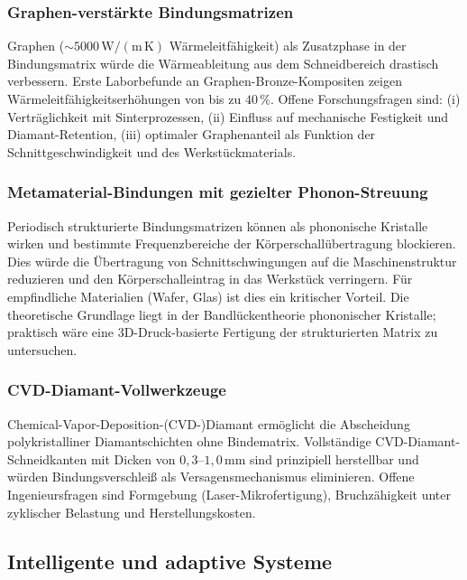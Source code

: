 ﻿\documentclass[a4paper,12pt]{article}
\theoremstyle{definition}
\begin{document}
\subsubsection{Graphen-verstärkte Bindungsmatrizen}

Graphen ($\sim 5000\,\mathrm{W/(m\,K)}$ Wärmeleitfähigkeit) als Zusatzphase in der
Bindungsmatrix würde die Wärmeableitung aus dem Schneidbereich drastisch verbessern.
Erste Laborbefunde an Graphen-Bronze-Kompositen zeigen Wärmeleitfähigkeitserhöhungen
von bis zu $40\,\%$. Offene Forschungsfragen sind: (i) Verträglichkeit mit Sinterprozessen,
(ii) Einfluss auf mechanische Festigkeit und Diamant-Retention, (iii) optimaler
Graphenanteil als Funktion der Schnittgeschwindigkeit und des Werkstückmaterials.

\subsubsection{Metamaterial-Bindungen mit gezielter Phonon-Streuung}

Periodisch strukturierte Bindungsmatrizen können als phononische Kristalle wirken
und bestimmte Frequenzbereiche der Körperschallübertragung blockieren. Dies würde
die Übertragung von Schnittschwingungen auf die Maschinenstruktur reduzieren und
den Körperschalleintrag in das Werkstück verringern. Für empfindliche Materialien
(Wafer, Glas) ist dies ein kritischer Vorteil. Die theoretische Grundlage liegt in
der Bandlückentheorie phononischer Kristalle; praktisch wäre eine 3D-Druck-basierte
Fertigung der strukturierten Matrix zu untersuchen.

\subsubsection{CVD-Diamant-Vollwerkzeuge}

Chemical-Vapor-Deposition-(CVD-)Diamant ermöglicht die Abscheidung polykristalliner
Diamantschichten ohne Bindematrix. Vollständige CVD-Diamant-Schneidkanten mit Dicken
von $0{,}3$--$1{,}0\,\mathrm{mm}$ sind prinzipiell herstellbar und würden
Bindungsverschleiß als Versagensmechanismus eliminieren. Offene Ingenieursfragen
sind Formgebung (Laser-Mikrofertigung), Bruchzähigkeit unter zyklischer Belastung
und Herstellungskosten.

\subsection{Intelligente und adaptive Systeme}
\end{document}
